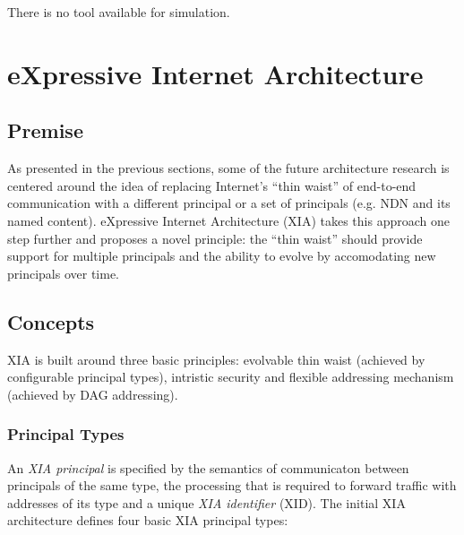             There is no tool available for simulation.

    \section{eXpressive Internet Architecture}\label{archs:xia}

        \subsection{Premise}

            As presented in the previous sections, some of the future architecture research is centered around the idea of replacing Internet's ``thin waist'' of end-to-end communication with a different principal or a set of principals (e.g. NDN and its named content). eXpressive Internet Architecture (XIA) takes this approach one step further and proposes a novel principle: the ``thin waist'' should provide support for multiple principals and the ability to evolve by accomodating new principals over time.

        \subsection{Concepts}

            XIA is built around three basic principles: evolvable thin waist (achieved by configurable principal types), intristic security and flexible addressing mechanism (achieved by DAG addressing).

            \subsubsection{Principal Types}

                An \emph{XIA principal} is specified by the semantics of communicaton between principals of the same type, the processing that is required to forward traffic with addresses of its type and a unique \emph{XIA identifier} (XID). The initial XIA architecture defines four basic XIA principal types:

